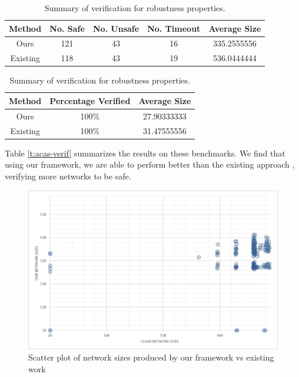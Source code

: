 \begin{table}
    \centering
        \begin{tabular}{ |c|c|c|c|c| }
        \hline
        Method                   & No. Safe    & No. Unsafe & No. Timeout & Average Size \\ 
        \hline
        Ours                     &   121       & 43         & 16          &  335.2555556\\
        Existing \cite{cegar-nn} &   118       & 43         & 19          &  536.0444444\\
        \hline                                                                
        \end{tabular}
        \caption{Summary of \acasxu verification. }
        \label{t:acas-verif}
    \footnotesize
    \begin{tabular}{ |c|c|c| }
    \hline
    Method                   & Percentage Verified  & Average Size \\ 
    \hline
    Ours                     &   100\%              &  27.90333333\\
    Existing \cite{cegar-nn} &   100\%              &  31.47555556\\
    \hline                                                                
    \end{tabular}
    \caption{Summary of \acasxu verification for robustness properties. }
    \label{t:acas-verif-robustness}
    \vspace{-1cm}
    \end{table}


Table \ref{t:acas-verif} summarizes the results on these benchmarks. We find that
using our framework, we are able to perform better than the existing \cegar
approach \cite{cegar-nn}, verifying more networks to be safe.

\begin{figure}
    \vspace*{-1cm}
    \includegraphics[scale=0.3]{figs/scatter-cegar-our-nerualsat.png}
    \caption{Scatter plot of network sizes produced by our framework vs existing
    work \cite{cegar-nn} }
    \label{f:scatter-netsizes}
    \vspace*{-1cm}
\end{figure}


